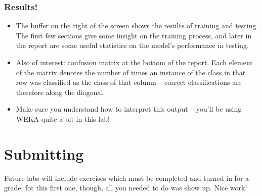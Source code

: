 \documentclass[11pt]{cselabheader}
\begin{document}
\subsubsection{Results!}

\begin{itemize}[leftmargin=*]

\item The buffer on the right of the screen shows the results of training and testing. The first few sections give some insight on the training process, and later in the report are some useful statistics on the model's performance in testing.

\item Also of interest: confusion matrix at the bottom of the report. Each element of the matrix denotes the number of times an instance of the class in that row was classified as the class of that column -- correct classifications are therefore along the diagonal.

\item Make sure you understand how to interpret this output -- you'll be using WEKA quite a bit in this lab!

\end{itemize}

\section{Submitting}

Future labs will include exercises which must be completed and turned in for a grade; for this first one, though, all you needed to do was show up. Nice work!



\end{document}

